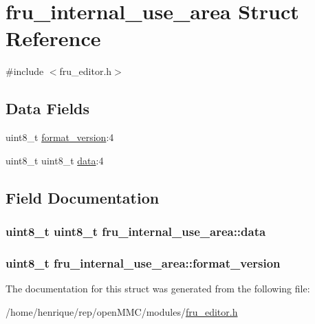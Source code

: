 \hypertarget{structfru__internal__use__area}{\section{fru\-\_\-internal\-\_\-use\-\_\-area Struct Reference}
\label{structfru__internal__use__area}
}


{\ttfamily \#include $<$fru\-\_\-editor.\-h$>$}

\subsection*{Data Fields}
\begin{DoxyCompactItemize}
\item 
uint8\-\_\-t \hyperlink{structfru__internal__use__area_acffae3f6d95f1c04d9d7f2b41212fc68}{format\-\_\-version}\-:4
\item 
uint8\-\_\-t uint8\-\_\-t \hyperlink{structfru__internal__use__area_a70e3dc62aa51876ead5a49be87649061}{data}\-:4
\end{DoxyCompactItemize}


\subsection{Field Documentation}
\hypertarget{structfru__internal__use__area_a70e3dc62aa51876ead5a49be87649061}{
\subsubsection[{data}]{\setlength{\rightskip}{0pt plus 5cm}uint8\-\_\-t uint8\-\_\-t fru\-\_\-internal\-\_\-use\-\_\-area\-::data}}\label{structfru__internal__use__area_a70e3dc62aa51876ead5a49be87649061}
\hypertarget{structfru__internal__use__area_acffae3f6d95f1c04d9d7f2b41212fc68}{
\subsubsection[{format\-\_\-version}]{\setlength{\rightskip}{0pt plus 5cm}uint8\-\_\-t fru\-\_\-internal\-\_\-use\-\_\-area\-::format\-\_\-version}}\label{structfru__internal__use__area_acffae3f6d95f1c04d9d7f2b41212fc68}


The documentation for this struct was generated from the following file\-:\begin{DoxyCompactItemize}
\item 
/home/henrique/rep/open\-M\-M\-C/modules/\hyperlink{fru__editor_8h}{fru\-\_\-editor.\-h}\end{DoxyCompactItemize}
